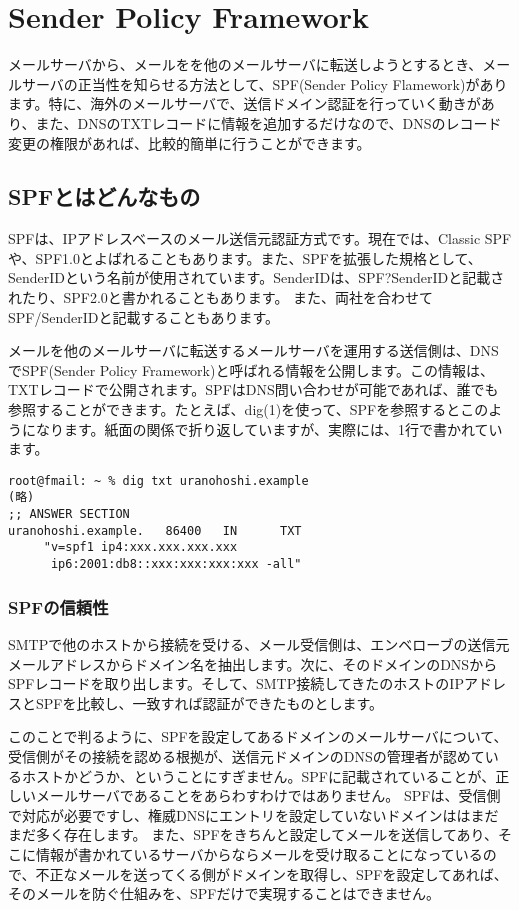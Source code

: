 \chapter{Sender Policy Framework}

メールサーバから、メールをを他のメールサーバに転送しようとするとき、メールサーバの正当性を知らせる方法として、SPF(Sender Policy Flamework)があります。特に、海外のメールサーバで、送信ドメイン認証を行っていく動きがあり、また、DNSのTXTレコードに情報を追加するだけなので、DNSのレコード変更の権限があれば、比較的簡単に行うことができます。

\section{SPFとはどんなもの}

SPFは、IPアドレスベースのメール送信元認証方式です。現在では、Classic SPFや、SPF1.0とよばれることもあります。また、SPFを拡張した規格として、SenderIDという名前が使用されています。SenderIDは、SPF?SenderIDと記載されたり、SPF2.0と書かれることもあります。
また、両社を合わせてSPF/SenderIDと記載することもあります。

メールを他のメールサーバに転送するメールサーバを運用する送信側は、DNSでSPF(Sender Policy Framework)と呼ばれる情報を公開します。この情報は、TXTレコードで公開されます。SPFはDNS問い合わせが可能であれば、誰でも参照することができます。たとえば、dig(1)を使って、SPFを参照するとこのようになります。紙面の関係で折り返していますが、実際には、1行で書かれています。

\begin{verbatim}
root@fmail: ~ % dig txt uranohoshi.example
(略)
;; ANSWER SECTION
uranohoshi.example.   86400   IN      TXT
     "v=spf1 ip4:xxx.xxx.xxx.xxx 
      ip6:2001:db8::xxx:xxx:xxx:xxx -all"
\end{verbatim}

\subsection{SPFの信頼性}
SMTPで他のホストから接続を受ける、メール受信側は、エンベローブの送信元メールアドレスからドメイン名を抽出します。次に、そのドメインのDNSからSPFレコードを取り出します。そして、SMTP接続してきたのホストのIPアドレスとSPFを比較し、一致すれば認証ができたものとします。

このことで判るように、SPFを設定してあるドメインのメールサーバについて、受信側がその接続を認める根拠が、送信元ドメインのDNSの管理者が認めているホストかどうか、ということにすぎません。SPFに記載されていることが、正しいメールサーバであることをあらわすわけではありません。
SPFは、受信側で対応が必要ですし、権威DNSにエントリを設定していないドメインははまだまだ多く存在します。
また、SPFをきちんと設定してメールを送信してあり、そこに情報が書かれているサーバからならメールを受け取ることになっているので、不正なメールを送ってくる側がドメインを取得し、SPFを設定してあれば、そのメールを防ぐ仕組みを、SPFだけで実現することはできません。

